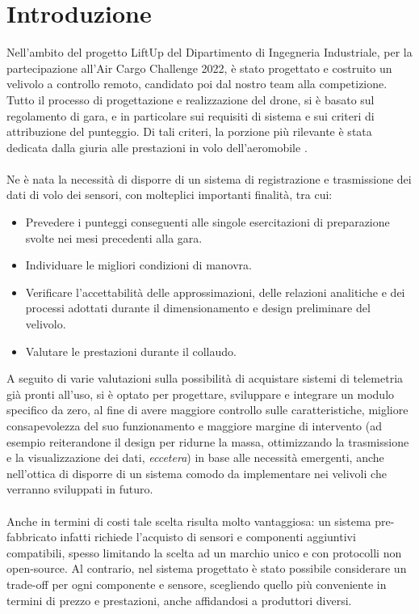 \documentclass[12pt]{article}
\begin{document}
\newpage
\tableofcontents
\newpage

\section{Introduzione} 
Nell'ambito del progetto LiftUp del Dipartimento di Ingegneria Industriale, per la partecipazione all'Air Cargo Challenge 2022, è stato progettato e costruito un velivolo a controllo remoto, candidato poi dal nostro team alla competizione.
Tutto il processo di progettazione e realizzazione del drone, si è basato sul regolamento di gara, e in particolare sui requisiti di sistema e sui criteri di attribuzione del punteggio. Di tali criteri, la porzione più rilevante è stata dedicata dalla giuria alle prestazioni in volo dell'aeromobile \cite{regulation}. 
\\\\
Ne è nata la necessità di disporre di un sistema di registrazione e trasmissione dei dati di volo dei sensori, con molteplici importanti finalità, tra cui: 

\begin{itemize}
\item Prevedere i punteggi conseguenti alle singole esercitazioni di preparazione svolte nei mesi precedenti alla gara.
\item Individuare le migliori condizioni di manovra.
\item Verificare l'accettabilità delle approssimazioni, delle relazioni analitiche e dei processi adottati durante il dimensionamento e design preliminare del velivolo.
\item Valutare le prestazioni durante il collaudo.
\end{itemize}

\noindent
A seguito di varie valutazioni sulla possibilità di acquistare sistemi di telemetria già pronti all'uso, si è optato per progettare, sviluppare e integrare un modulo specifico da zero, al fine di avere maggiore controllo sulle caratteristiche, migliore consapevolezza del suo funzionamento e maggiore margine di intervento (ad esempio reiterandone il design per ridurne la massa, ottimizzando la trasmissione e la visualizzazione dei dati, \textit{eccetera}) in base alle necessità emergenti, anche nell'ottica di disporre di un sistema comodo da implementare nei velivoli che verranno sviluppati in futuro.
\\\\
Anche in termini di costi tale scelta risulta molto vantaggiosa: un sistema pre-fabbricato infatti richiede l'acquisto di sensori e componenti aggiuntivi compatibili, spesso limitando la scelta ad un marchio unico e con protocolli non open-source. Al contrario, nel sistema progettato è stato possibile considerare un trade-off per ogni componente e sensore, scegliendo quello più conveniente in termini di prezzo e prestazioni, anche affidandosi a produttori diversi. 
\end{document}
